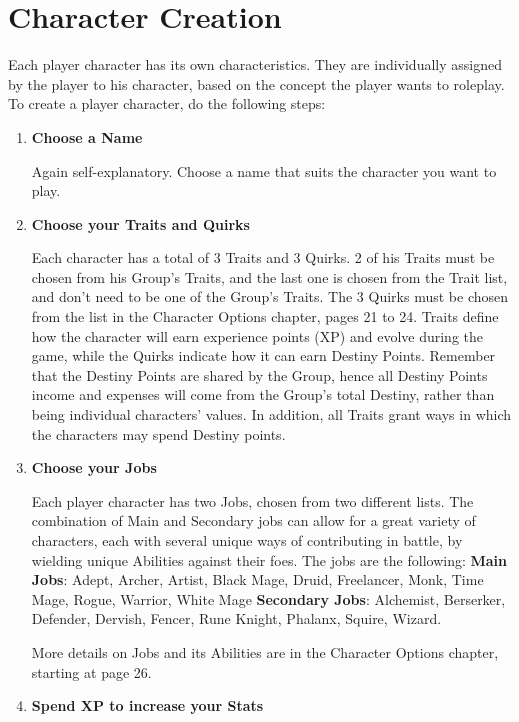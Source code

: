 \section{Character Creation}
\label{sec:creation}
\begin{multicols}{2}
Each player character has its own characteristics. They are individually assigned by the player to his character, based on the concept the player wants to roleplay. To create a player character, do the following steps:
\begin{enumerate}
\item \textbf{Choose a Name}

Again self-explanatory. Choose a name that suits the character you want to play.

\item \textbf{Choose your Traits and Quirks}

Each character has a total of 3 Traits and 3 Quirks. 2 of his Traits must be chosen from his Group’s Traits, and the last one is chosen from the Trait list, and don’t need to be one of the Group's Traits. The 3 Quirks must be chosen from the list in the Character Options chapter, pages 21 to 24. Traits define how the character will earn experience points (XP) and evolve during the game, while the Quirks indicate how it can earn Destiny Points. Remember that the Destiny Points are shared by the Group, hence all Destiny Points income and expenses will come from the Group's total Destiny, rather than being individual characters’ values. In addition, all Traits grant ways in which the characters may spend Destiny points.

\item \textbf{Choose your Jobs}

Each player character has two Jobs, chosen from two different lists. The combination of Main and Secondary jobs can allow for a great variety of characters, each with several unique ways of contributing in battle, by wielding unique Abilities against their foes. The jobs are the following:
\textbf{Main Jobs}: Adept, Archer, Artist, Black Mage, Druid, Freelancer, Monk, Time Mage, Rogue, Warrior, White Mage
\textbf{Secondary Jobs}: Alchemist, Berserker, Defender, Dervish, Fencer, Rune Knight, Phalanx, Squire, Wizard.

More details on Jobs and its Abilities are in the Character Options chapter, starting at page 26.

\item \textbf{Spend XP to increase your Stats}


\end{enumerate}
\end{multicols}
